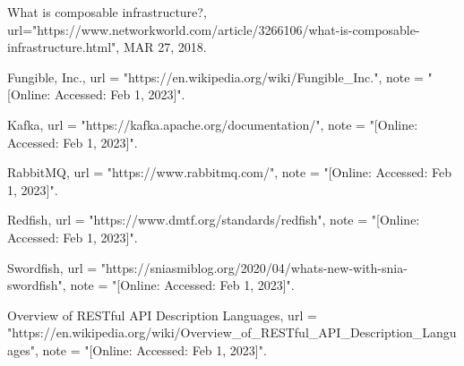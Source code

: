 \documentclass[conference]{IEEEtran}
\begin{document}
\begin{thebibliography}{20}
  What is composable infrastructure?,
  url="https://www.networkworld.com/article/3266106/what-is-composable-infrastructure.html",
  MAR 27, 2018.

  Fungible, Inc.,
  url = "https://en.wikipedia.org/wiki/Fungible_Inc.",
  note = "[Online: Accessed: Feb 1, 2023]".
  
  Kafka,
  url = "https://kafka.apache.org/documentation/",
  note = "[Online: Accessed: Feb 1, 2023]".

  RabbitMQ,
  url = "https://www.rabbitmq.com/",
  note = "[Online: Accessed: Feb 1, 2023]".
 
   Redfish,
   url = "https://www.dmtf.org/standards/redfish",
   note = "[Online: Accessed: Feb 1, 2023]".
 
   Swordfish,
   url = "https://sniasmiblog.org/2020/04/whats-new-with-snia-swordfish",
   note = "[Online: Accessed: Feb 1, 2023]".
   
   Overview of RESTful API Description Languages,
   url = "https://en.wikipedia.org/wiki/Overview_of_RESTful_API_Description_Languages",
   note = "[Online: Accessed: Feb 1, 2023]".

\end{thebibliography}
\end{document}
